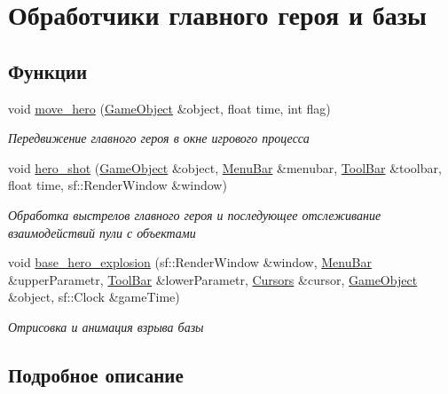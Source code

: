 \hypertarget{group__heroBaseHandler}{}\section{Обработчики главного героя и базы}
\label{group__heroBaseHandler}
\subsection*{Функции}
\begin{DoxyCompactItemize}
\item 
void \hyperlink{group__heroBaseHandler_ga3eed5602a3e229026dfc84af49007688}{move\+\_\+hero} (\hyperlink{classGameObject}{Game\+Object} \&object, float time, int flag)
\begin{DoxyCompactList}\small\item\em Передвижение главного героя в окне игрового процесса \end{DoxyCompactList}\item 
void \hyperlink{group__heroBaseHandler_gab2905c57e79ad2fcc3e51dd7fd5916dc}{hero\+\_\+shot} (\hyperlink{classGameObject}{Game\+Object} \&object, \hyperlink{classMenuBar}{Menu\+Bar} \&menubar, \hyperlink{classToolBar}{Tool\+Bar} \&toolbar, float time, sf\+::\+Render\+Window \&window)
\begin{DoxyCompactList}\small\item\em Обработка выстрелов главного героя и последующее отслеживание взаимодействий пули с объектами \end{DoxyCompactList}\item 
void \hyperlink{group__heroBaseHandler_ga4b8f8d1c761e24c0a8480a7489d349d1}{base\+\_\+hero\+\_\+explosion} (sf\+::\+Render\+Window \&window, \hyperlink{classMenuBar}{Menu\+Bar} \&upper\+Parametr, \hyperlink{classToolBar}{Tool\+Bar} \&lower\+Parametr, \hyperlink{classCursors}{Cursors} \&cursor, \hyperlink{classGameObject}{Game\+Object} \&object, sf\+::\+Clock \&game\+Time)
\begin{DoxyCompactList}\small\item\em Отрисовка и анимация взрыва базы \end{DoxyCompactList}\end{DoxyCompactItemize}


\subsection{Подробное описание}


